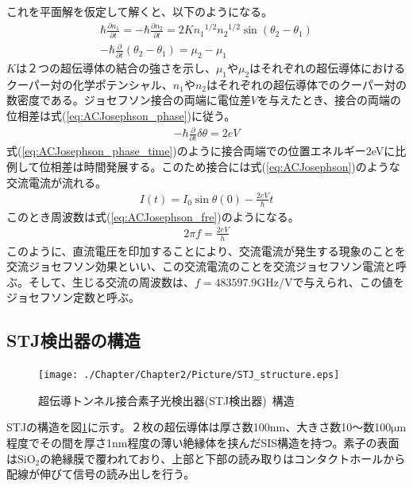 		これを平面解を仮定して解くと、以下のようになる。
		\begin{eqnarray}
			\hbar \frac{\partial n_1}{\partial t} = - \hbar \frac{\partial n_2}{\partial t} = 2 K {n_1}^{1/2} {n_2}^{1/2} \sin (\theta_2 - \theta_1) \\
			- \hbar \frac{\partial}{\partial t} (\theta_2 - \theta_1) = \mu_2 - \mu_1
			\label{eq:ACJosephson_phase}
		\end{eqnarray}
		$K$は２つの超伝導体の結合の強さを示し、$\mu_1$や$\mu_2$はそれぞれの超伝導体におけるクーパー対の化学ポテンシャル、$n_1$や$n_2$はそれぞれの超伝導体でのクーパー対の数密度である。ジョセフソン接合の両端に電位差$V$を与えたとき、接合の両端の位相差は式(\ref{eq:ACJosephson_phase})に従う。
		\begin{eqnarray}
		- \hbar \frac{\partial}{\partial t} \delta \theta = 2eV
		\label{eq:ACJosephson_phase_time}
		\end{eqnarray}
		式(\ref{eq:ACJosephson_phase_time})のように接合両端での位置エネルギー2eVに比例して位相差は時間発展する。このため接合には式(\ref{eq:ACJosephson})のような交流電流が流れる。
		\begin{eqnarray}
			I(t) = I_{0} \sin { \theta (0) - \frac{2eV}{\hbar} t }
			\label{eq:ACJosephson}
		\end{eqnarray}
		このとき周波数は式(\ref{eq:ACJosephson_fre})のようになる。
		\begin{eqnarray}
			2 \pi f = \frac{2eV}{h}
			\label{eq:ACJosephson_fre}
		\end{eqnarray}
		このように、直流電圧を印加することにより、交流電流が発生する現象のことを交流ジョセフソン効果といい、この交流電流のことを交流ジョセフソン電流と呼ぶ。そして、生じる交流の周波数は、$f = 483597.9 \mathrm{GHz/V}$で与えられ、この値をジョセフソン定数と呼ぶ。
	
	\subsection{STJ検出器の構造}
		\begin{figure}[htbp]
  			\begin{center}
    				\texttt{[image: ./Chapter/Chapter2/Picture/STJ\_structure.eps]}
    				\caption{超伝導トンネル接合素子光検出器(STJ検出器)\ 構造}
    				\label{fig:STJ_structure}
  			\end{center}
		\end{figure}
		STJの構造を図\ref{fig:STJ_structure}に示す。２枚の超伝導体は厚さ数100nm、大きさ数10〜数100$\mathrm{\mu m}$程度でその間を厚さ1nm程度の薄い絶縁体を挟んだSIS構造を持つ。素子の表面は$\mathrm{SiO_2}$の絶縁膜で覆われており、上部と下部の読み取りはコンタクトホールから配線が伸びて信号の読み出しを行う。
	
